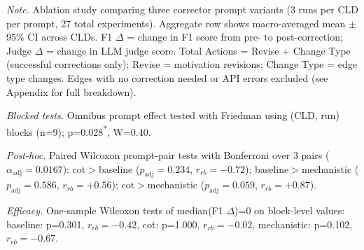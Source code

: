 \begin{table}[H]
\centering
\begin{minipage}{\linewidth}
\centering
\caption{Corrector Prompt Ablation on Ground Truth: Performance Comparison}
\label{tab:rq1b_prompt_ablation_groundtruth}
\begin{threeparttable}
\end{threeparttable}
\vspace{0.5em}
\footnotesize
\textit{Note.} Ablation study comparing three corrector prompt variants (3 runs per CLD per prompt, 27 total experiments). 
Aggregate row shows macro-averaged mean $\pm$ 95\% CI across CLDs.
F1 $\Delta$ = change in F1 score from pre- to post-correction; Judge $\Delta$ = change in LLM judge score.
Total Actions = Revise + Change Type (successful corrections only); Revise = motivation revisions; Change Type = edge type changes.
Edges with no correction needed or API errors excluded (see Appendix for full breakdown).\par
\textit{Blocked tests.} Omnibus prompt effect tested with Friedman using (CLD, run) blocks (n=9); p=0.028\textsuperscript{*}, W=0.40.\par
\textit{Post-hoc.} Paired Wilcoxon prompt-pair tests with Bonferroni over 3 pairs ($\alpha_{\text{adj}}=0.0167$): cot$>$baseline ($p_{\text{adj}}=0.234$, $r_{rb}=-0.72$); baseline$>$mechanistic ($p_{\text{adj}}=0.586$, $r_{rb}=+0.56$); cot$>$mechanistic ($p_{\text{adj}}=0.059$, $r_{rb}=+0.87$).\par
\textit{Efficacy.} One-sample Wilcoxon tests of median(F1 $\Delta$)=0 on block-level values: baseline: p=0.301, $r_{rb}=-0.42$, cot: p=1.000, $r_{rb}=-0.02$, mechanistic: p=0.102, $r_{rb}=-0.67$.

\end{minipage}
\end{table}
